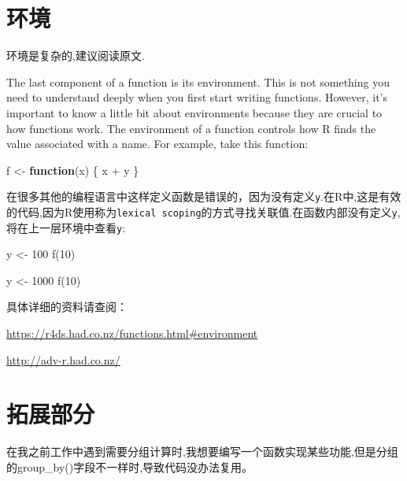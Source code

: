 \documentclass[
]{book}
\newenvironment{Shaded}{\begin{snugshade}}{\end{snugshade}}
\newcommand{\ControlFlowTok}[1]{\textcolor[rgb]{0.13,0.29,0.53}{\textbf{#1}}}
\newcommand{\DecValTok}[1]{\textcolor[rgb]{0.00,0.00,0.81}{#1}}
\newcommand{\FunctionTok}[1]{\textcolor[rgb]{0.00,0.00,0.00}{#1}}
\newcommand{\NormalTok}[1]{#1}
\newcommand{\OtherTok}[1]{\textcolor[rgb]{0.56,0.35,0.01}{#1}}
\newcommand{\SpecialCharTok}[1]{\textcolor[rgb]{0.00,0.00,0.00}{#1}}
\begin{document}
\hypertarget{ux73afux5883}{%
\section{环境}\label{ux73afux5883}}

环境是复杂的,建议阅读原文.

The last component of a function is its environment. This is not something you need to understand deeply when you first start writing functions. However, it's important to know a little bit about environments because they are crucial to how functions work. The environment of a function controls how R finds the value associated with a name. For example, take this function:

\begin{Shaded}
\begin{Highlighting}[]
\NormalTok{f }\OtherTok{\textless{}{-}} \ControlFlowTok{function}\NormalTok{(x) \{}
\NormalTok{  x }\SpecialCharTok{+}\NormalTok{ y}
\NormalTok{\} }
\end{Highlighting}
\end{Shaded}

在很多其他的编程语言中这样定义函数是错误的，因为没有定义\texttt{y}.在R中,这是有效的代码,因为R使用称为\texttt{lexical\ scoping}的方式寻找关联值.在函数内部没有定义\texttt{y},将在上一层环境中查看\texttt{y}:

\begin{Shaded}
\begin{Highlighting}[]
\NormalTok{y }\OtherTok{\textless{}{-}} \DecValTok{100}
\FunctionTok{f}\NormalTok{(}\DecValTok{10}\NormalTok{)}

\NormalTok{y }\OtherTok{\textless{}{-}} \DecValTok{1000}
\FunctionTok{f}\NormalTok{(}\DecValTok{10}\NormalTok{)}
\end{Highlighting}
\end{Shaded}

具体详细的资料请查阅：

\url{https://r4ds.had.co.nz/functions.html\#environment}

\url{http://adv-r.had.co.nz/}

\hypertarget{ux62d3ux5c55ux90e8ux5206}{%
\section{拓展部分}\label{ux62d3ux5c55ux90e8ux5206}}

在我之前工作中遇到需要分组计算时,我想要编写一个函数实现某些功能,但是分组的group\_by()字段不一样时,导致代码没办法复用。
\end{document}
